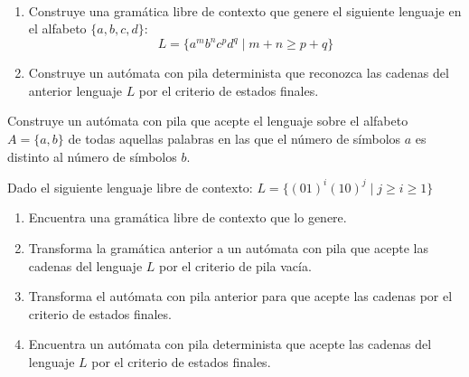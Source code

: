 \begin{ejercicio}\label{ej:1.5.26}\ 
    \begin{enumerate}
        \item Construye una gramática libre de contexto que genere el siguiente lenguaje en el alfabeto $\{a,b,c,d\}$:
            \begin{equation*}
                L = \{a^m b^n c^p d^q \mid m+n\geq p+q\}
            \end{equation*}
        \item Construye un autómata con pila determinista que reconozca las cadenas del anterior lenguaje $L$ por el criterio de estados finales.
    \end{enumerate}
\end{ejercicio}

\begin{ejercicio}\label{ej:1.5.27}
    Construye un autómata con pila que acepte el lenguaje sobre el alfabeto $A = \{a,b\}$ de todas aquellas palabras en las que el número de símbolos $a$ es distinto al número de símbolos $b$.
\end{ejercicio}

\begin{ejercicio}\label{ej:1.5.28}
    Dado el siguiente lenguaje libre de contexto: $L = \{{(01)}^{i}{(10)}^{j}\mid j\geq i \geq 1\}$
    \begin{enumerate}[label=(\alph*)]
        \item Encuentra una gramática libre de contexto que lo genere.
        \item Transforma la gramática anterior a un autómata con pila que acepte las cadenas del lenguaje $L$ por el criterio de pila vacía.
        \item Transforma el autómata con pila anterior para que acepte las cadenas por el criterio de estados finales.
        \item Encuentra un autómata con pila determinista que acepte las cadenas del lenguaje $L$ por el criterio de estados finales.
    \end{enumerate}
\end{ejercicio}

